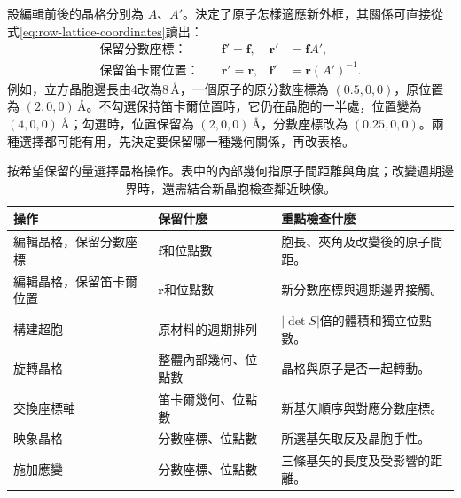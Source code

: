 設編輯前後的晶格分別為 $A$、$A'$。決定了原子怎樣適應新外框，其關係可直接從式\eqref{eq:row-lattice-coordinates}讀出：
\begin{equation}
 \begin{aligned}
 \text{保留分數座標：}\quad&\mathbf f'=\mathbf f,
       &\mathbf r'&=\mathbf f A',\\
 \text{保留笛卡爾位置：}\quad&\mathbf r'=\mathbf r,
       &\mathbf f'&=\mathbf r(A')^{-1}.
 \end{aligned}
 \label{eq:lattice-preservation-options}
\end{equation}
例如，立方晶胞邊長由4改為8\,\AA，一個原子的原分數座標為 $(0.5,0,0)$，原位置為 $(2,0,0)\,\text{\AA}$。不勾選保持笛卡爾位置時，它仍在晶胞的一半處，位置變為 $(4,0,0)\,\text{\AA}$；勾選時，位置保留為 $(2,0,0)\,\text{\AA}$，分數座標改為 $(0.25,0,0)$。兩種選擇都可能有用，先決定要保留哪一種幾何關係，再改表格。

\begin{table}[!htb]
\centering\small
\begin{tabularx}{\linewidth}{p{30mm}XX}
\toprule
操作 & 保留什麼 & 重點檢查什麼\\
\midrule
編輯晶格，保留分數座標 & $\mathbf f$和位點數 & 胞長、夾角及改變後的原子間距。\\
編輯晶格，保留笛卡爾位置 & $\mathbf r$和位點數 & 新分數座標與週期邊界接觸。\\
構建超胞 & 原材料的週期排列 & $|\det S|$倍的體積和獨立位點數。\\
旋轉晶格 & 整體內部幾何、位點數 & 晶格與原子是否一起轉動。\\
交換座標軸 & 笛卡爾幾何、位點數 & 新基矢順序與對應分數座標。\\
映象晶格 & 分數座標、位點數 & 所選基矢取反及晶胞手性。\\
施加應變 & 分數座標、位點數 & 三條基矢的長度及受影響的距離。\\
\bottomrule
\end{tabularx}
\caption{按希望保留的量選擇晶格操作。表中的內部幾何指原子間距離與角度；改變週期邊界時，還需結合新晶胞檢查鄰近映像。}
\label{tab:round10-lattice-invariants}
\end{table}
